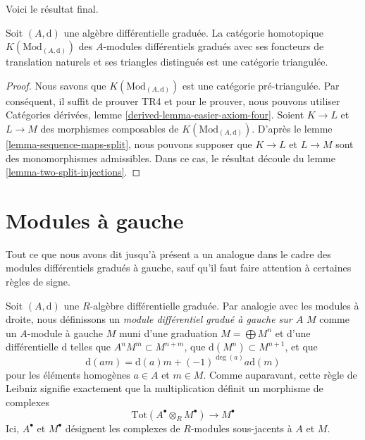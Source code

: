 \noindent
Voici le résultat final.

\begin{proposition}
\label{proposition-homotopy-category-triangulated}
Soit $(A, \text{d})$ une algèbre différentielle graduée. La catégorie homotopique
$K(\text{Mod}_{(A, \text{d})})$ des $A$-modules différentiels gradués avec ses
foncteurs de translation naturels et ses triangles distingués est une catégorie
triangulée.
\end{proposition}

\begin{proof}
Nous savons que $K(\text{Mod}_{(A, \text{d})})$ est une catégorie pré-triangulée. Par
conséquent, il suffit de prouver TR4 et pour le prouver, nous
pouvons utiliser Catégories dérivées, lemme
\ref{derived-lemma-easier-axiom-four}. Soient $K \to L$ et $L \to M$ des morphismes composables
de $K(\text{Mod}_{(A, \text{d})})$.
D'après le lemme \ref{lemma-sequence-maps-split}, nous pouvons
supposer que $K \to L$ et $L \to M$ sont des monomorphismes
admissibles. Dans ce cas, le résultat découle du
lemme \ref{lemma-two-split-injections}.
\end{proof}











\section{Modules à gauche}
\label{section-left-modules}

\noindent
Tout ce que nous avons dit jusqu'à présent a un analogue dans le cadre
des modules différentiels gradués à gauche, sauf qu'il faut faire
attention à certaines règles de signe.

\medskip\noindent
Soit $(A, \text{d})$ une $R$-algèbre différentielle graduée.
Par analogie avec les modules à droite, nous
définissons un {\it module différentiel gradué à gauche sur $A$} $M$
comme un $A$-module à gauche $M$ muni d'une graduation $M =
\bigoplus M^n$ et d'une différentielle $\text{d}$ telles que $A^n M^m
\subset M^{n + m}$, que $\text{d}(M^n) \subset M^{n + 1}$, et que
$$
\text{d}(am) = \text{d}(a) m + (-1)^{\deg(a)}a \text{d}(m)
$$
pour les éléments homogènes $a \in A$ et $m \in M$. Comme auparavant, cette
règle de Leibniz signifie exactement que la multiplication définit un
morphisme de complexes
$$
\text{Tot}(A^\bullet \otimes_R M^\bullet) \to M^\bullet
$$
Ici, $A^\bullet$ et $M^\bullet$ désignent les complexes de $R$-modules
sous-jacents à $A$ et $M$.


